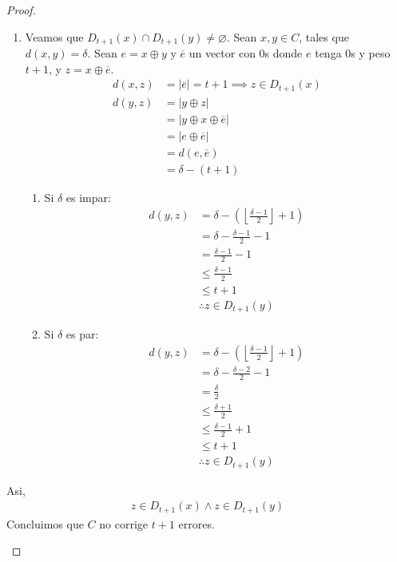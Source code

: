 \begin{proof}
\begin{enumerate}
\begin{enumerate}
        \item Veamos que $D_{t+1}(x) \cap D_{t+1}(y) \neq \varnothing$. Sean $x,y \in C$, tales que $d(x,y) = \delta$. Sean $e = x \oplus y$ y $\overline{e}$ un vector con $0$s donde $e$ tenga $0$s y peso $t+1$, y $z = x \oplus \overline{e}$.
        \begin{align}
        d(x,z)
        &= |\overline{e}| = t+1 \implies z \in D_{t+1}(x)\\
        d(y,z)
        &= |y \oplus z|\\
        &= |y \oplus x \oplus \overline{e}|\\
        &= |e \oplus \overline{e}|\\
        &= d(e, \overline{e})\\
        &= \delta - (t+1)
        \end{align}
            \begin{enumerate}
            \item Si $\delta$ es impar:
            \begin{align}
            d(y,z) &= \delta - \left(\left\lfloor{\frac{\delta - 1}{2}}\right\rfloor + 1\right)\\
            &= \delta - \frac{\delta-1}{2} - 1\\
            &= \frac{\delta-1}{2} - 1\\
            &\le \frac{\delta-1}{2}\\
            &\le t + 1\\
            &\therefore z \in D_{t+1}(y)
            \end{align}
            \item Si $\delta$ es par:
            \begin{align}
            d(y,z)
            &= \delta - \left(\left\lfloor{\frac{\delta - 1}{2}}\right\rfloor + 1\right)\\
            &= \delta - \frac{\delta-2}{2} - 1\\
            &= \frac{\delta}{2}\\
            &\le \frac{\delta+1}{2}\\
            &\le \frac{\delta-1}{2} + 1\\
            &\le t + 1\\
            &\therefore z \in D_{t+1}(y)
            \end{align}
            \end{enumerate}
        \end{enumerate}
    Asi,
    \begin{align}
    z \in D_{t+1}(x) \wedge z \in D_{t+1}(y)
    \end{align}
    Concluimos que $C$ no corrige $t+1$ errores.
    \end{enumerate}
\end{proof}

